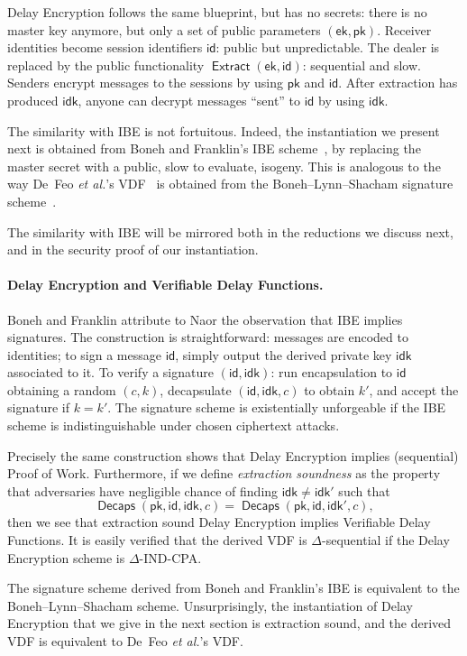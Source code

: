 \documentclass{llncs}
\DeclareMathOperator{\Extract}{\mathsf{Extract}}
\DeclareMathOperator{\Decaps}{\mathsf{Decaps}}
\newcommand{\ek}{\mathsf{ek}}
\newcommand{\pk}{\mathsf{pk}}
\newcommand{\id}{\mathsf{id}}
\newcommand{\idk}{\mathsf{idk}}
\begin{document}
Delay Encryption follows the same blueprint, but has no secrets:
there is no master key anymore, but only a set of public parameters $(\ek,\pk)$. %
Receiver identities become session identifiers $\id$: public but
unpredictable. %
The dealer is replaced by the public functionality
$\Extract(\ek,\id)$: sequential and slow. %
Senders encrypt messages to the sessions by using $\pk$ and $\id$. %
After extraction has produced $\idk$, anyone can decrypt messages
``sent'' to $\id$ by using $\idk$.

The similarity with IBE is not fortuitous. %
Indeed, the instantiation we present next is obtained from Boneh and
Franklin's IBE scheme~\cite{doi:10.1137/S0097539701398521}, by
replacing the master secret with a public, slow to evaluate, isogeny.
This is analogous to the way De~Feo \emph{et al.}'s
VDF~\cite{10.1007/978-3-030-34578-5_10} is obtained from the
Boneh--Lynn--Shacham signature scheme~\cite{boneh+lynn+shacham04}.

The similarity with IBE will be mirrored both in the reductions we
discuss next, and in the security proof of our instantiation.

\paragraph{Delay Encryption and Verifiable Delay Functions.}
Boneh and Franklin attribute to Naor the observation that IBE implies
signatures. %
The construction is straightforward: messages are encoded to
identities; to sign a message $\id$, simply output the derived private
key $\idk$ associated to it. %
To verify a signature $(\id,\idk)$: run encapsulation to $\id$
obtaining a random $(c,k)$, decapsulate $(\id,\idk,c)$ to obtain $k'$,
and accept the signature if $k=k'$. %
The signature scheme is existentially unforgeable if the IBE scheme is
indistinguishable under chosen ciphertext attacks.

Precisely the same construction shows that Delay Encryption implies
(sequential) Proof of Work. %
Furthermore, if we define \emph{extraction soundness} as the property
that adversaries have negligible chance of finding $\idk\ne\idk'$ such
that
\[\Decaps(\pk,\id,\idk,c) = \Decaps(\pk,\id,\idk',c),\]
then we see that extraction sound Delay Encryption implies Verifiable
Delay Functions. %
It is easily verified that the derived VDF is $\Delta$-sequential if
the Delay Encryption scheme is $\Delta$-IND-CPA.

The signature scheme derived from Boneh and Franklin's IBE is
equivalent to the Boneh--Lynn--Shacham scheme. %
Unsurprisingly, the instantiation of Delay Encryption that we give in
the next section is extraction sound, and the derived VDF is
equivalent to De~Feo \emph{et al.}'s VDF.
\end{document}
